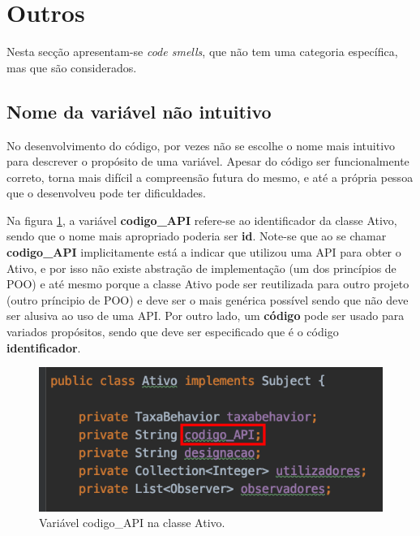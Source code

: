 \newpage
\section{Outros}
Nesta secção apresentam-se \emph{code smells}, que não tem uma categoria específica, mas que são considerados.

\subsection{Nome da variável não intuitivo}

\hspace{5mm} No desenvolvimento do código, por vezes não se escolhe o nome mais intuitivo para descrever o propósito de uma variável. Apesar do código ser funcionalmente correto, torna mais difícil a compreensão futura do mesmo, e até a própria pessoa que o desenvolveu pode ter dificuldades.

\hspace{5mm} Na figura \ref{img:pag7}, a variável \textbf{codigo\_API} refere-se ao identificador da classe Ativo, sendo que o nome mais apropriado poderia ser \textbf{id}. Note-se que ao se chamar \textbf{codigo\_API} implicitamente está a indicar que utilizou uma API para obter o Ativo, e por isso não existe abstração de implementação (um dos princípios de POO) e até mesmo porque a classe Ativo pode ser reutilizada para outro projeto (outro príncipio de POO) e deve ser o mais genérica possível sendo que não deve ser alusiva ao uso de uma API. Por outro lado, um \textbf{código} pode ser usado para variados propósitos, sendo que deve ser especificado que é o código \textbf{identificador}. 

\begin{figure}[H]
	\centering
	\includegraphics[scale=0.55]{images/change_variable_name_before.png}
	\caption{Variável codigo\_API na classe Ativo.}
	\label{img:pag7}
\end{figure}


